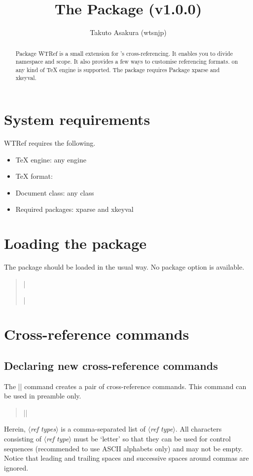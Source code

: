 \documentclass[a4paper]{article}
\title{The {\ThisPkg} Package (v1.0.0)}
\author{Takuto Asakura (wtsnjp)}
\newcommand{\PkgName}[1]{\textsf{#1}}
\newcommand{\ThisPkg}{\PkgName{WTRef}}
\newcommand{\Meta}[1]{$\langle$\mbox{}\textit{#1}\mbox{}$\rangle$}
\newenvironment{syntax}{\begin{quote}\small}{\end{quote}}
\begin{document}
\maketitle

\begin{abstract}
Package {\ThisPkg} is a small extension for {\LaTeXe}'s cross-referencing. It
enables you to divide namespace and scope. It also provides a few ways to
customise referencing formats. {\LaTeXe} on any kind of {\TeX} engine is
supported. The package requires Package \PkgName{xparse} and \PkgName{xkeyval}.
\end{abstract}

\section{System requirements}

{\ThisPkg} requires the following.
%
\begin{itemize}
\item {\TeX} engine: any engine
\item {\TeX} format: \LaTeXe
\item Document class: any class
\item Required packages: \PkgName{xparse} and \PkgName{xkeyval}
\end{itemize}

\section{Loading the package}

The package should be loaded in the usual {\LaTeXe} way. No package option is
available.
%
\begin{syntax}
|\usepackage{wtref}|
\end{syntax}

\section{Cross-reference commands}

\subsection{Declaring new cross-reference commands}

The |\newref| command creates a pair of cross-reference commands. This command
can be used in preamble only.
%
\begin{syntax}
|\newref[|\Meta{options}|]{|\Meta{ref types}|}|
\end{syntax}
%
Herein, \Meta{ref types} is a comma-separated list of \Meta{ref type}. All
characters consisting of \Meta{ref type} must be `letter' so that they can be
used for control sequences (recommended to use ASCII alphabets only) and may
not be empty. Notice that leading and trailing spaces and successive spaces
around commas are ignored.
\end{document}

